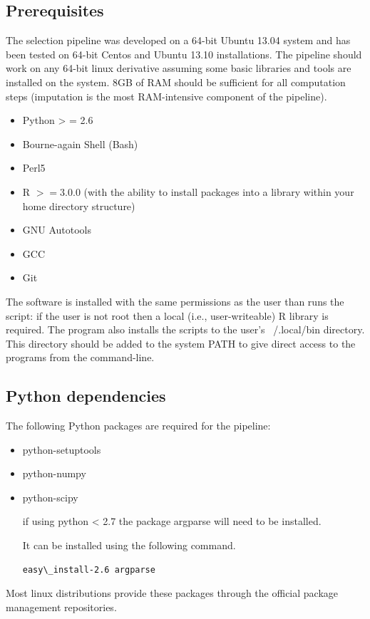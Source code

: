 \documentclass[a4paper,10pt]{article}
\begin{document}
\subsection{Prerequisites}
The selection pipeline was developed on a 64-bit Ubuntu 13.04 system
and has been tested on 64-bit Centos and Ubuntu 13.10
installations. The pipeline should work on any 64-bit linux derivative
assuming some basic libraries and tools are installed on the
system. 8GB of RAM should be sufficient for all computation steps
(imputation is the most RAM-intensive component of the pipeline).

\begin{itemize}
\item Python > = 2.6 
\item Bourne-again Shell (Bash)
\item Perl5
\item R \( >= 3.0.0 \) (with the ability to install packages into a
  library within your home directory structure)
\item GNU Autotools
\item GCC 
\item Git
\end{itemize}
The software is installed with the same permissions as the user than
runs the script: if the user is not root then a local (i.e.,
user-writeable) R library is
required. The program also installs the scripts to the user's
~/.local/bin directory.  This directory should be added to the system
PATH to give direct access to the programs from the command-line. 
 
\subsection{Python dependencies}
The following Python packages are required for the pipeline:
\begin{itemize}
\item python-setuptools
\item python-numpy
\item python-scipy

if using python < 2.7 the package argparse will need to be installed.

It can be installed using the following command.

\begin{verbatim}
easy\_install-2.6 argparse
\end{verbatim}
\end{itemize}
Most linux distributions provide these packages through the official
package management repositories.
\end{document}
